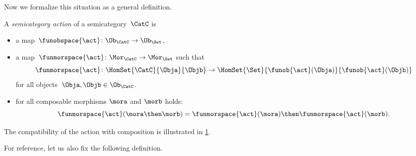 Now we formalize this situation as a general definition.

\begin{ctdefinition}
    \label{def:semicategory-action}
    A \emph{semicategory action} of a semicategory~$\CatC$ is

    \constit
    \begin{itemize}
        \item a map~$\funobspace{\act} \colon \Ob_{\CatC} \to \Ob_{\Set}$,
        \item a map~$\funmorspace{\act} \colon \Mor_\CatC \to \Mor_\Set$ such that
              \begin{equation}
                  \funmorspace{\act} \colon  \HomSet{\CatC}{\Obja}{\Objb} \to \HomSet{\Set}{ \funob{\act}(\Obja)}{\funob{\act}(\Objb)}
              \end{equation}
              for all objects~$\Obja, \Objb \in \Ob_{\CatC}$.
    \end{itemize}

    \condit

    \begin{itemize}
        \item for all composable morphisms $\mora$ and $\morb$ holds:
              \begin{equation}
                  \funmorspace{\act}(\mora \then \morb) = \funmorspace{\act}(\mora) \then \funmorspace{\act}(\morb).
              \end{equation}
    \end{itemize}
\end{ctdefinition}

The compatibility of the action with composition is illustrated in \cref{fig:semicat_ac_comm}.

\begin{figure}[h!]
    \centering
    \caption{}
    \label{fig:semicat_ac_comm}
\end{figure}

For reference, let us also fix the following definition.

